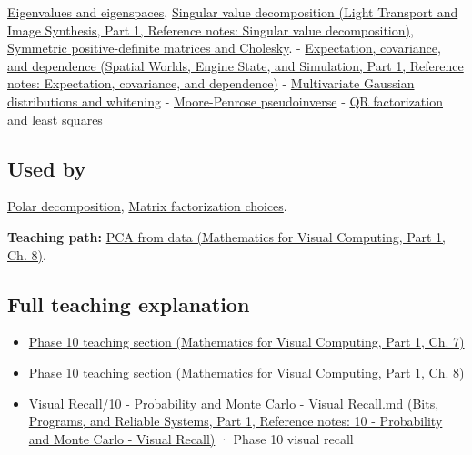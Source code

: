 \hypertarget{appendix-ad175ef3c5bf-prerequisites}{}

\hyperref[appendix-0b3be18411f9]{Eigenvalues and eigenspaces}, \href{../04-Light-Transport-and-Image-Synthesis-P01/main.pdf\#nameddest=appendix-1fad5e7f36fa}{Singular value decomposition (Light Transport and Image Synthesis, Part 1, Reference notes: Singular value decomposition)}, \hyperref[appendix-50d2ea3c9b26]{Symmetric positive-definite matrices and Cholesky}. - \href{../05-Spatial-Worlds-Engine-State-and-Simulation-P01/main.pdf\#nameddest=appendix-54c383df9992}{Expectation, covariance, and dependence (Spatial Worlds, Engine State, and Simulation, Part 1, Reference notes: Expectation, covariance, and dependence)} - \hyperref[appendix-12bbe185dbe5]{Multivariate Gaussian distributions and whitening} - \hyperref[appendix-541306fdbc1b]{Moore-Penrose pseudoinverse} - \hyperref[appendix-c3421e6b4f2c]{QR factorization and least squares}

\subsection{Used by}\label{appendix-ad175ef3c5bf-used-by}

\hypertarget{appendix-ad175ef3c5bf-used-by}{}

\hyperref[appendix-73f5bcf7a462]{Polar decomposition}, \hyperref[appendix-221a483bec2d]{Matrix factorization choices}.

\textbf{Teaching path:} \href{../02-Mathematics-for-Visual-Computing-P01/main.pdf\#nameddest=02-foundations-ii-ch024-pca-turns-a-cloud-of-points-into-measured-variation}{PCA from data (Mathematics for Visual Computing, Part 1, Ch. 8)}.

\subsection{Full teaching explanation}\label{appendix-ad175ef3c5bf-full-teaching-explanation}

\hypertarget{appendix-ad175ef3c5bf-full-teaching-explanation}{}

\begin{itemize}
\tightlist
\item
  \href{../02-Mathematics-for-Visual-Computing-P01/main.pdf\#nameddest=02-foundations-ii-ch023-expected-values-describe-centers-covariance-describes-dependence}{Phase 10 teaching section (Mathematics for Visual Computing, Part 1, Ch. 7)}
\item
  \href{../02-Mathematics-for-Visual-Computing-P01/main.pdf\#nameddest=02-foundations-ii-ch024-waiting-times-event-counts-and-covariance-geometry}{Phase 10 teaching section (Mathematics for Visual Computing, Part 1, Ch. 8)}
\item
  \href{../01-Bits-Programs-and-Reliable-Systems-P01/main.pdf\#nameddest=appendix-cb5af353ef77}{Visual Recall/10 - Probability and Monte Carlo - Visual Recall.md (Bits, Programs, and Reliable Systems, Part 1, Reference notes: 10 - Probability and Monte Carlo - Visual Recall)} · Phase 10 visual recall
\end{itemize}
